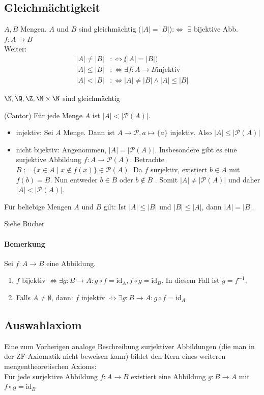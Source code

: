 \subsection{Gleichmächtigkeit}
$A,B$ Mengen. $A$ und $B$ sind gleichmächtig ($|A|=|B|$):$\iff$ $\exists$ bijektive Abb. $f: A \to B$\\
Weiter:
\begin{align*}
	|A|\neq |B| & :\iff \not(|A|=|B|)                     \\
	|A|\leq |B| & :\iff \exists f: A\to B \text{injektiv} \\
	|A|< |B|    & :\iff |A|\neq |B| \land |A|\leq |B|
\end{align*}
\begin{example}
	$\N, \Q, \Z, \N\times \N$ sind gleichmächtig
\end{example}
\begin{theorem}
	(Cantor) Für jede Menge $A$ ist $|A| < |\mathcal{P}(A)|$.
\end{theorem}
\prove 
\begin{itemize}
	\item injektiv: Sei $A$ Menge. Dann ist $A\to \mathcal{P}, a \mapsto \{a\}$ injektiv. Also $|A|\leq |\mathcal{P}(A)|$
	\item nicht bijektiv: Angenommen, $|A|=|\mathcal{P}(A)|$. Insbesondere gibt es eine surjektive Abbildung $f: A \to \mathcal{P}(A)$. Betrachte $B:=\{x\in A\mid x \not\in f(x)\} \in \mathcal{P}(A)$. Da $f$ surjektiv, existiert $b \in A$ mit $f(b)=B$. Nun entweder $b\in B$ oder $b\not\in B$ \lightning. Somit $|A|\neq|\mathcal{P}(A)|$ und daher $|A| < |\mathcal{P}(A)|$.
\end{itemize}
\begin{theorem}
	Für beliebige Mengen $A$ und $B$ gilt: Ist $|A|\leq |B|$ und $|B|\leq |A|$, dann $|A|=|B|$.
\end{theorem}
\prove Siehe Bücher
\paragraph{Bemerkung} Sei $f: A\to B$ eine Abbildung.
\begin{enumerate}
	\item $f$ bijektiv $\iff \exists g: B\to A: g\circ f=\mathrm{id}_A, f\circ g=\mathrm{id}_B$. In diesem Fall ist $g=f^{-1}$.
	\item Falls $A \neq \emptyset$, dann: $f$ injektiv $\iff \exists g:B\to A: g\circ f=\mathrm{id}_A$
\end{enumerate}
\subsection{Auswahlaxiom}
Eine zum Vorherigen analoge Beschreibung surjektiver Abbildungen (die man in der ZF-Axiomatik nicht beweisen kann) bildet den Kern eines weiteren mengentheoretischen Axioms:\\
Für jede surjektive Abbildung $f: A\to B$ existiert eine Abbildung $g: B\to A$ mit $f\circ g=\mathrm{id}_B$ 
